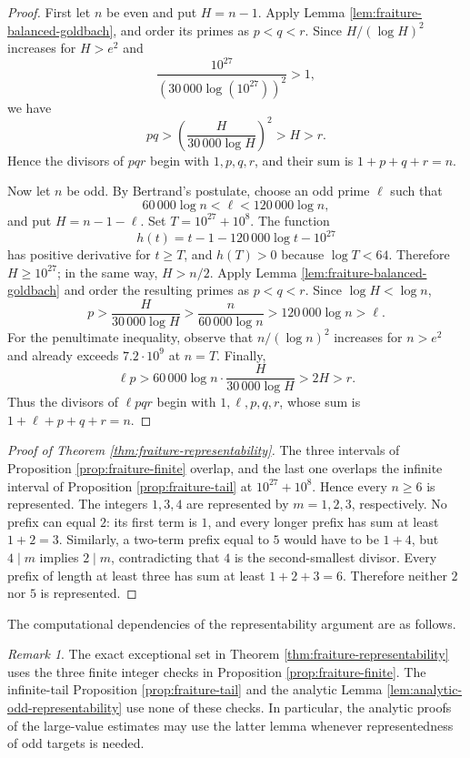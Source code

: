 \documentclass[11pt,letterpaper,reqno]{amsart}
\numberwithin{equation}{section}
\theoremstyle{remark}
\newtheorem{remark}[theorem]{Remark}
\newcommand{\1}{\mathbf 1}
\renewcommand{\geq}{\geqslant}
\begin{document}
\begin{proof}
First let $n$ be even and put $H=n-1$. Apply
Lemma \ref{lem:fraiture-balanced-goldbach}, and order its primes as
$p<q<r$. Since $H/(\log H)^2$ increases for $H>e^2$ and
\[
 \frac{10^{27}}{(30\,000\log(10^{27}))^2}>1,
\]
we have
\[
 pq>\left(\frac{H}{30\,000\log H}\right)^2>H>r.
\]
Hence the divisors of $pqr$ begin with $1,p,q,r$, and their sum is
$1+p+q+r=n$.

Now let $n$ be odd. By Bertrand's postulate, choose an odd prime $\ell$
such that
\[
 60\,000\log n<\ell<120\,000\log n,
\]
and put $H=n-1-\ell$. Set $T=10^{27}+10^8$. The function
\[
 h(t)=t-1-120\,000\log t-10^{27}
\]
has positive derivative for $t\geq T$, and $h(T)>0$ because
$\log T<64$. Therefore $H\geq10^{27}$; in the same way,
$H>n/2$. Apply Lemma \ref{lem:fraiture-balanced-goldbach} and order
the resulting primes as $p<q<r$. Since $\log H<\log n$,
\[
 p>\frac{H}{30\,000\log H}
 >\frac{n}{60\,000\log n}
 >120\,000\log n>\ell.
\]
For the penultimate inequality, observe that
$n/(\log n)^2$ increases for $n>e^2$ and already exceeds
$7.2\cdot10^9$ at $n=T$. Finally,
\[
 \ell p>
 60\,000\log n\cdot\frac{H}{30\,000\log H}
 >2H>r.
\]
Thus the divisors of $\ell pqr$ begin with $1,\ell,p,q,r$, whose sum is
$1+\ell+p+q+r=n$.
\end{proof}

\begin{proof}[Proof of Theorem \ref{thm:fraiture-representability}]
The three intervals of Proposition \ref{prop:fraiture-finite} overlap,
and the last one overlaps the infinite interval of
Proposition \ref{prop:fraiture-tail} at $10^{27}+10^8$.
Hence every $n\geq6$ is represented. The integers $1,3,4$ are represented
by $m=1,2,3$, respectively. No prefix can equal $2$: its first term is
$1$, and every longer prefix has sum at least $1+2=3$. Similarly, a
two-term prefix equal to $5$ would have to be $1+4$, but $4\mid m$
implies $2\mid m$, contradicting that $4$ is the second-smallest divisor.
Every prefix of length at least three has sum at least $1+2+3=6$.
Therefore neither $2$ nor $5$ is represented.
\end{proof}


The computational dependencies of the representability argument are as follows.

\begin{remark}
The exact exceptional set in Theorem \ref{thm:fraiture-representability}
uses the three finite integer checks in
Proposition \ref{prop:fraiture-finite}. The infinite-tail
Proposition \ref{prop:fraiture-tail} and the analytic
Lemma \ref{lem:analytic-odd-representability} use none of these checks. In particular,
the analytic proofs of the large-value estimates may use the latter
lemma whenever representedness of odd targets is needed.
\end{remark}
\end{document}
